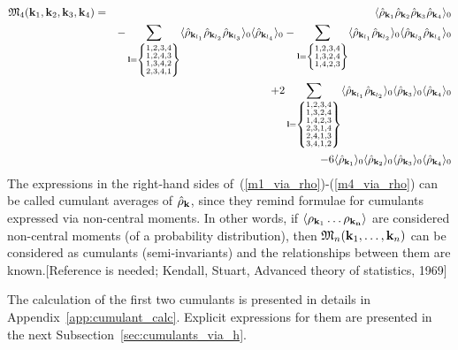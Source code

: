 \begin{eqnarray}
	\label{m4_via_rho}
	\mathfrak{M}_4(\vb k_1, \vb k_2, \vb k_3, \vb k_4) &=& 
	\langle \hat{\rho}_{\vb k_1} \hat{\rho}_{\vb k_2} \hat{\rho}_{\vb k_3} \hat{\rho}_{\vb k_4} \rangle_0 
	\nonumber\\
	&& - \sum_{\vb l = \left\{\substack{1,2,3,4 \\ 1,2,4,3 \\ 1,3,4,2 \\ 2,3,4,1}\right\}} 
	\langle \hat{\rho}_{\vb k_{l_1}} \hat{\rho}_{\vb k_{l_2}} \hat{\rho}_{\vb k_{l_3}} \rangle_0 \langle \hat{\rho}_{\vb k_{l_4}} \rangle_0
	-\sum_{\vb l = \left\{\substack{1,2,3,4 \\ 1,3,2,4 \\ 1,4,2,3 }\right\} } \langle \hat{\rho}_{\vb k_{l_1}} \hat{\rho}_{\vb k_{l_2}} \rangle_0 \langle \hat{\rho}_{\vb k_{l_3}} \hat{\rho}_{\vb k_{l_4}} \rangle_0 
	\nonumber\\
	&& +2 \sum_{\vb l = \left\{\substack{1,2,3,4 \\ 1,3,2,4 \\ 1,4,2,3 \\ 2,3,1,4 \\ 2,4,1,3 \\ 3,4,1,2 }\right\} } \langle \hat{\rho}_{\vb k_{l_1}} \hat{\rho}_{\vb k_{l_2}} \rangle_0 \langle\hat{\rho}_{\vb k_3} \rangle_0 \langle\hat{\rho}_{\vb k_4} \rangle_0
	\nonumber\\
	&& -6 \langle \hat{\rho}_{\vb k_1} \rangle_0 \langle\hat{\rho}_{\vb k_2} \rangle_0 \langle\hat{\rho}_{\vb k_3} \rangle_0 \langle\hat{\rho}_{\vb k_4} \rangle_0
\end{eqnarray}
The expressions in the right-hand sides of~(\ref{m1_via_rho})-(\ref{m4_via_rho}) can be called cumulant averages of $\hat{\rho}_{\vb k}$, since they remind formulae for cumulants expressed via non-central moments. In other words, if $\langle\rho_{\vb k_1} \dotsc \rho_{\bf k_n} \rangle$ are considered non-central moments (of a probability distribution), then $\mathfrak{M}_n(\vb k_1, \dotsc, \vb k_n)$ can be considered as cumulants (semi-invariants) and the relationships between them are known.[Reference is needed; Kendall, Stuart, Advanced theory of statistics, 1969]

The calculation of the first two cumulants is presented in details in Appendix~\ref{app:cumulant_calc}. Explicit expressions for them are presented in the next Subsection~\ref{sec:cumulants_via_h}.

